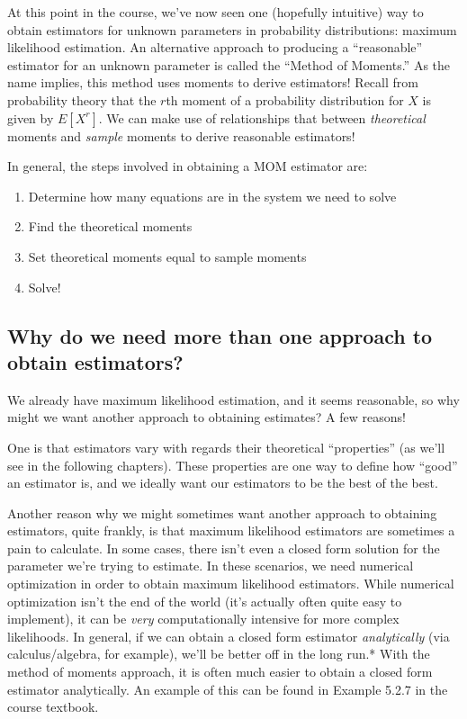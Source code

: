 \documentclass[
  letterpaper,
  DIV=11,
  numbers=noendperiod]{scrreprt}
\begin{document}
At this point in the course, we've now seen one (hopefully intuitive)
way to obtain estimators for unknown parameters in probability
distributions: maximum likelihood estimation. An alternative approach to
producing a ``reasonable'' estimator for an unknown parameter is called
the ``Method of Moments.'' As the name implies, this method uses moments
to derive estimators! Recall from probability theory that the \(r\)th
moment of a probability distribution for \(X\) is given by \(E[X^r]\).
We can make use of relationships that between \emph{theoretical} moments
and \emph{sample} moments to derive reasonable estimators!

In general, the steps involved in obtaining a MOM estimator are:

\begin{enumerate}
\def\labelenumi{\arabic{enumi}.}
\item
  Determine how many equations are in the system we need to solve
\item
  Find the theoretical moments
\item
  Set theoretical moments equal to sample moments
\item
  Solve!
\end{enumerate}

\subsection*{Why do we need more than one approach to obtain
estimators?}\label{why-do-we-need-more-than-one-approach-to-obtain-estimators}

We already have maximum likelihood estimation, and it seems reasonable,
so why might we want another approach to obtaining estimates? A few
reasons!

One is that estimators vary with regards their theoretical
``properties'' (as we'll see in the following chapters). These
properties are one way to define how ``good'' an estimator is, and we
ideally want our estimators to be the best of the best.

Another reason why we might sometimes want another approach to obtaining
estimators, quite frankly, is that maximum likelihood estimators are
sometimes a pain to calculate. In some cases, there isn't even a closed
form solution for the parameter we're trying to estimate. In these
scenarios, we need numerical optimization in order to obtain maximum
likelihood estimators. While numerical optimization isn't the end of the
world (it's actually often quite easy to implement), it can be
\emph{very} computationally intensive for more complex likelihoods. In
general, if we can obtain a closed form estimator \emph{analytically}
(via calculus/algebra, for example), we'll be better off in the long
run.* With the method of moments approach, it is often much easier to
obtain a closed form estimator analytically. An example of this can be
found in Example 5.2.7 in the course textbook.
\end{document}
